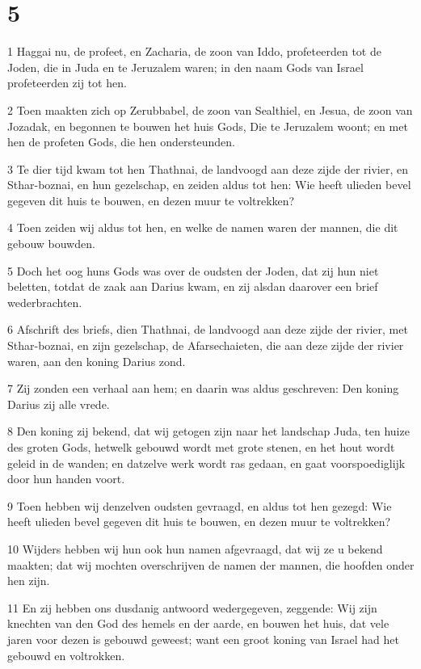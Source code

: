 \chapter{5}

\par 1 Haggai nu, de profeet, en Zacharia, de zoon van Iddo, profeteerden tot de Joden, die in Juda en te Jeruzalem waren; in den naam Gods van Israel profeteerden zij tot hen.
\par 2 Toen maakten zich op Zerubbabel, de zoon van Sealthiel, en Jesua, de zoon van Jozadak, en begonnen te bouwen het huis Gods, Die te Jeruzalem woont; en met hen de profeten Gods, die hen ondersteunden.
\par 3 Te dier tijd kwam tot hen Thathnai, de landvoogd aan deze zijde der rivier, en Sthar-boznai, en hun gezelschap, en zeiden aldus tot hen: Wie heeft ulieden bevel gegeven dit huis te bouwen, en dezen muur te voltrekken?
\par 4 Toen zeiden wij aldus tot hen, en welke de namen waren der mannen, die dit gebouw bouwden.
\par 5 Doch het oog huns Gods was over de oudsten der Joden, dat zij hun niet beletten, totdat de zaak aan Darius kwam, en zij alsdan daarover een brief wederbrachten.
\par 6 Afschrift des briefs, dien Thathnai, de landvoogd aan deze zijde der rivier, met Sthar-boznai, en zijn gezelschap, de Afarsechaieten, die aan deze zijde der rivier waren, aan den koning Darius zond.
\par 7 Zij zonden een verhaal aan hem; en daarin was aldus geschreven: Den koning Darius zij alle vrede.
\par 8 Den koning zij bekend, dat wij getogen zijn naar het landschap Juda, ten huize des groten Gods, hetwelk gebouwd wordt met grote stenen, en het hout wordt geleid in de wanden; en datzelve werk wordt ras gedaan, en gaat voorspoediglijk door hun handen voort.
\par 9 Toen hebben wij denzelven oudsten gevraagd, en aldus tot hen gezegd: Wie heeft ulieden bevel gegeven dit huis te bouwen, en dezen muur te voltrekken?
\par 10 Wijders hebben wij hun ook hun namen afgevraagd, dat wij ze u bekend maakten; dat wij mochten overschrijven de namen der mannen, die hoofden onder hen zijn.
\par 11 En zij hebben ons dusdanig antwoord wedergegeven, zeggende: Wij zijn knechten van den God des hemels en der aarde, en bouwen het huis, dat vele jaren voor dezen is gebouwd geweest; want een groot koning van Israel had het gebouwd en voltrokken.
